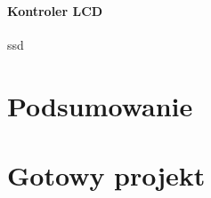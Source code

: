 \documentclass[a4paper,12pt]{book}
\begin{document}
				\subsubsection{Kontroler LCD}
					ssd
		
	\chapter{Podsumowanie}

	
	
	
	
	
	\appendix
	
	\chapter{Gotowy projekt}
	\label{app:gotowy_projekt}
%		
%		
%		
%		
\end{document}
